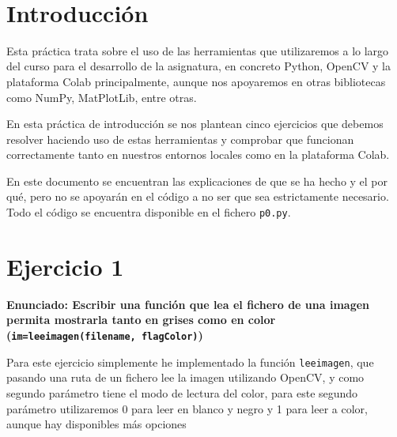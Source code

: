 \documentclass[12pt, spanish]{article}
\makeatletter
\let\thedate\@date
\makeatother
\begin{document}
\begin{titlepage}
    {\large \thedate}\\[0.5cm]
    {\doclicenseThis}

    \vfill

\end{titlepage}


\tableofcontents
\pagebreak



\section*{Introducción}

Esta práctica trata sobre el uso de las herramientas que utilizaremos a lo largo del curso para el desarrollo de la asignatura, en concreto Python, OpenCV y la plataforma Colab principalmente, aunque nos apoyaremos en otras bibliotecas como NumPy, MatPlotLib, entre otras.

En esta práctica de introducción se nos plantean cinco ejercicios que debemos resolver haciendo uso de estas herramientas y comprobar que funcionan correctamente tanto en nuestros entornos locales como en la plataforma Colab.


En este documento se encuentran las explicaciones de que se ha hecho y el por qué, pero no se apoyarán en el código a no ser que sea estrictamente necesario. Todo el código se encuentra disponible en el fichero \texttt{p0.py}.

\newpage

\section{Ejercicio 1}

\textbf{\large Enunciado: Escribir una función que lea el fichero de una imagen permita mostrarla tanto en grises como en color (\texttt{im=leeimagen(filename, flagColor)})}


Para este ejercicio simplemente he implementado la función \texttt{leeimagen}, que pasando una ruta de un fichero lee la imagen utilizando OpenCV, y como segundo parámetro tiene el modo de lectura del color, para este segundo parámetro utilizaremos 0 para leer en blanco y negro y 1 para leer a color, aunque hay disponibles más opciones \cite{read_image_opencv}
\end{document}
